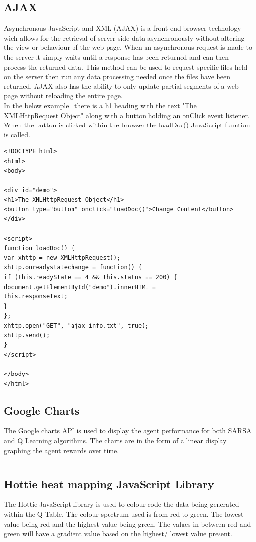 \subsection{AJAX}
Asynchronous JavaScript and XML (AJAX) is a front end browser technology wich allows for the retrieval of server side data asynchronously without altering the view or behaviour of the web page. When an asynchronous request is made to the server it simply waits until a response has been returned and can then process the returned data. This method can be used to request specific files held on the server then run any data processing needed once the files have been returned.  AJAX also has the ability to only update partial segments of a web page without reloading the entire page.~\cite{AJAX:online}\\
In the below example~\cite{AJAXDemo:online} there is a h1 heading with the text "The XMLHttpRequest Object" along with a button holding an onClick event listener. When the button is clicked within the browser the loadDoc() JavaScript function is called.\\
\begin{verbatim}
<!DOCTYPE html>
<html>
<body>

<div id="demo">
<h1>The XMLHttpRequest Object</h1>
<button type="button" onclick="loadDoc()">Change Content</button>
</div>

<script>
function loadDoc() {
var xhttp = new XMLHttpRequest();
xhttp.onreadystatechange = function() {
if (this.readyState == 4 && this.status == 200) {
document.getElementById("demo").innerHTML =
this.responseText;
}
};
xhttp.open("GET", "ajax_info.txt", true);
xhttp.send();
}
</script>

</body>
</html>
\end{verbatim}


\subsection{Google Charts}
The Google charts API is used to display the agent performance for both SARSA and Q Learning algorithms.
The charts are in the form of a linear display graphing the agent rewards over time.
\begin{verbatim}

\end{verbatim}
\subsection{Hottie heat mapping JavaScript Library}
The Hottie JavaScript library is used to colour code  the data being generated within the Q Table. The colour spectrum used is from red to green. The lowest value being red and the highest value being green. The values in between red and green will have a gradient value based on the highest/ lowest value present.
\begin{verbatim}

\end{verbatim}
